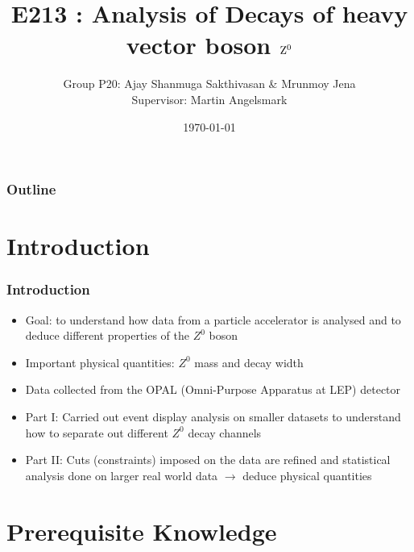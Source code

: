 \documentclass[10pt]{beamer}
\title[E213 : Analysis of Decays of heavy vector boson $\rm Z^{0}$] %
{E213 : Analysis of Decays of heavy vector boson $\rm Z^{0}$}
\author[Sakthivasan, Jena] %
{Group P20: Ajay Shanmuga Sakthivasan \& Mrunmoy Jena\\
Supervisor: Martin Angelsmark}
\date{\today}
\begin{document}
\begin{frame}
    \titlepage 
\end{frame}

\begin{frame}
    \frametitle{Outline}
    \tableofcontents
\end{frame}

\section{Introduction}
\begin{frame}
\frametitle{Introduction}
\begin{itemize}
\item Goal: to understand how data from a particle accelerator is analysed and to deduce different properties of the $Z^0$ boson
\item Important physical quantities: $Z^0$ mass and decay width 
\item Data collected from the OPAL (Omni-Purpose Apparatus at LEP) detector
\item Part I: Carried out event display analysis on smaller datasets to understand how to separate out different $Z^0$ decay channels
\item Part II: Cuts (constraints) imposed on the data are refined and statistical analysis done on larger real world data $\rightarrow$ deduce physical quantities
\end{itemize}
\end{frame}

\section{Prerequisite Knowledge}
\end{document}
